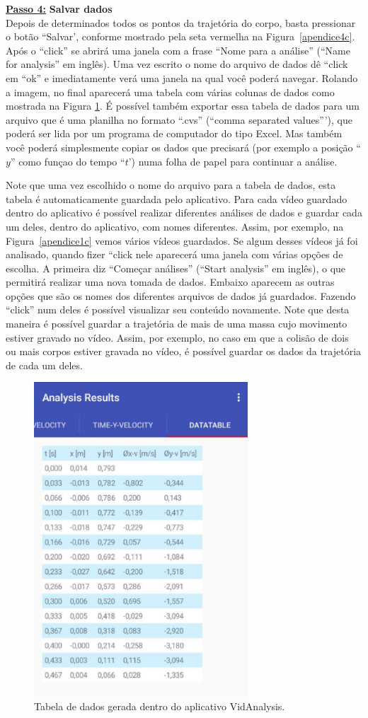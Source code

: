 \underline{\bf Passo 4:} {\bf Salvar dados}\\

Depois de determinados todos os pontos da trajetória do corpo, basta pressionar o botão ``Salvar', conforme mostrado pela seta vermelha na Figura~\ref{apendice4c}. Após o ``click'' se abrirá uma janela 
com a frase ``Nome para a análise'' (``Name for analysis'' em inglês). Uma vez escrito o nome do arquivo de dados dê ``click em ``ok'' e imediatamente verá uma janela na qual você poderá navegar. 
Rolando a imagem, no final aparecerá uma tabela com várias colunas de dados como mostrada na Figura \ref{apendice5c}.
É possível também exportar essa tabela de dados  para um arquivo que é uma planilha no formato ``.cvs'' (``comma separated values'''), que poderá ser lida por um programa de computador do tipo Excel. Mas também você poderá simplesmente copiar os dados que precisará (por exemplo 
a posição ``$y$'' como funçao do tempo ``$t$') numa folha de papel para continuar a análise. 
\par
Note que uma vez escolhido o nome do arquivo para a tabela de dados, esta tabela é automaticamente guardada pelo aplicativo. 
Para cada vídeo guardado dentro do aplicativo é possível realizar 
diferentes análises de dados e guardar cada um deles, dentro do aplicativo, 
com nomes diferentes.
Assim, por exemplo, na Figura~\ref{apendice1c} vemos vários vídeos guardados.
Se algum desses vídeos já foi analisado, quando fizer ``click nele aparecerá uma janela com 
várias opções de escolha. A primeira diz ``Começar análises'' (``Start analysis'' em inglês), o que permitirá realizar uma nova tomada de dados. Embaixo aparecem as outras opções que são
os nomes dos diferentes arquivos de dados já guardados. Fazendo ``click'' num deles é possível visualizar seu conteúdo novamente. Note que desta maneira é possível guardar a trajetória de mais de uma massa cujo movimento estiver gravado no vídeo. Assim, por exemplo, no caso em que a colisão de dois ou mais corpos estiver gravada no vídeo, é possível guardar os dados da trajetória de cada um deles.  

\begin{figure}[h!]
\centering
\includegraphics[width=8cm]{Figuras_exp3/imagenapendicec5.pdf}
\caption{\label{apendice5c} Tabela de dados gerada dentro do aplicativo VidAnalysis.}

\end{figure}